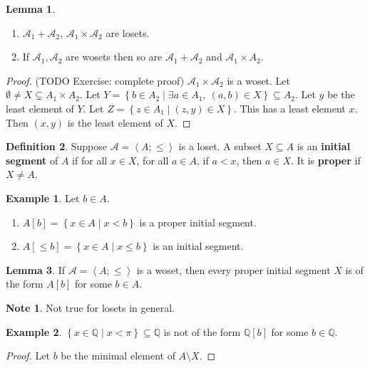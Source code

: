 \documentclass{article}
\newcommand{\Q}{\mathbb{Q}}
\newcommand{\A}{\mathcal{A}}
\newcommand{\rb}[1]{\left( #1 \right)}
\renewcommand{\sb}[1]{\left[ #1 \right]}
\newcommand{\cb}[1]{\left\{ #1 \right\}}
\newcommand{\ab}[1]{\left\langle #1 \right\rangle}
\theoremstyle{definition}\newtheorem{definition}{Definition}[subsection]
\theoremstyle{definition}\newtheorem{remark}[definition]{Remark}
\theoremstyle{definition}\newtheorem*{example}{Example}
\theoremstyle{definition}\newtheorem*{note}{Note}
\newtheorem{lemma}[definition]{Lemma}
\begin{document}
\begin{lemma}
\hfill
\begin{enumerate}
\item $ \A_1 + \A_2 $, $ \A_1 \times \A_2 $ are losets.
\item If $ \A_1, \A_2 $ are wosets then so are $ \A_1 + \A_2 $ and $ \A_1 \times A_2 $.
\end{enumerate}
\end{lemma}

\begin{proof}
(TODO Exercise: complete proof) $ \A_1 \times \A_2 $ is a woset. Let $ \emptyset \ne X \subsetneq A_1 \times A_2 $. Let $ Y = \cb{b \in A_2 \mid \exists a \in A_1, \ \rb{a, b} \in X} \subseteq A_2 $. Let $ y $ be the least element of $ Y $. Let $ Z = \cb{z \in A_1 \mid \rb{z, y} \in X} $. This has a least element $ x $. Then $ \rb{x, y} $ is the least element of $ X $.
\end{proof}

\begin{definition}
Suppose $ \A = \ab{A; \le} $ is a loset. A subset $ X \subseteq A $ is an \textbf{initial segment} of $ A $ if for all $ x \in X $, for all $ a \in A $, if $ a < x $, then $ a \in X $. It is \textbf{proper} if $ X \ne A $.
\end{definition}

\begin{example}
Let $ b \in A $.
\begin{enumerate}
\item $ A\sb{b} = \cb{x \in A \mid x < b} $ is a proper initial segment.
\item $ A\sb{\le b} = \cb{x \in A \mid x \le b} $ is an initial segment.
\end{enumerate}
\end{example}

\begin{lemma}
If $ \A = \ab{A; \le} $ is a woset, then every proper initial segment $ X $ is of the form $ A\sb{b} $ for some $ b \in A $.
\end{lemma}

\begin{note}
Not true for losets in general.
\end{note}

\begin{example}
$ \cb{x \in \Q \mid x < \pi} \subseteq \Q $ is not of the form $ \Q\sb{b} $ for some $ b \in \Q $.
\end{example}

\begin{proof}
Let $ b $ be the minimal element of $ A \setminus X $.
\end{proof}
\end{document}
